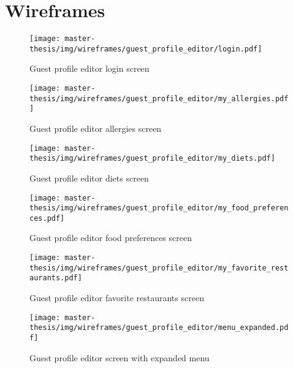 \section{Wireframes}
\begin{figure}[h]
  \centering
  \texttt{[image: master-thesis/img/wireframes/guest\_profile\_editor/login.pdf]}
  \caption{Guest profile editor login screen}
\end{figure}

\begin{figure}[h]
  \centering
  \texttt{[image: master-thesis/img/wireframes/guest\_profile\_editor/my\_allergies.pdf]}
  \caption{Guest profile editor allergies screen}
\end{figure}

\begin{figure}[h]
  \centering
  \texttt{[image: master-thesis/img/wireframes/guest\_profile\_editor/my\_diets.pdf]}
  \caption{Guest profile editor diets screen}
\end{figure}

\begin{figure}[h]
  \centering
  \texttt{[image: master-thesis/img/wireframes/guest\_profile\_editor/my\_food\_preferences.pdf]}
  \caption{Guest profile editor food preferences screen}
\end{figure}

\begin{figure}[h]
  \centering
  \texttt{[image: master-thesis/img/wireframes/guest\_profile\_editor/my\_favorite\_restaurants.pdf]}
  \caption{Guest profile editor favorite restaurants screen}
\end{figure}

\begin{figure}[h]
  \centering
  \texttt{[image: master-thesis/img/wireframes/guest\_profile\_editor/menu\_expanded.pdf]}
  \caption{Guest profile editor screen with expanded menu}
\end{figure}
